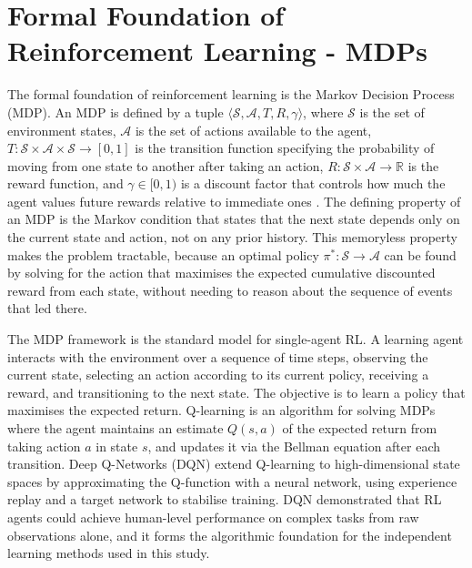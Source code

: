 \documentclass[a4paper,twoside,12pt]{report}
\begin{document}
    \section*{Formal Foundation of Reinforcement Learning - MDPs}
    \label{sec:mdps}
    The formal foundation of reinforcement learning is the Markov Decision Process (MDP). An MDP is defined by a tuple $\langle \mathcal{S}, \mathcal{A}, T, R,
    \gamma \rangle$, where $\mathcal{S}$ is the set of environment states,
    $\mathcal{A}$ is the set of actions available to the agent, $T : \mathcal{S} \times \mathcal{A} \times \mathcal{S} \to [0,1]$ is the transition function specifying the probability of moving from one state to another after taking an action, $R : \mathcal{S} \times \mathcal{A} \to \mathbb{R}$ is the reward function, and $\gamma \in [0,1)$ is a discount factor that controls how much the agent values future rewards relative to immediate ones \citep{sutton2018}.
    The defining property of an MDP is the Markov condition that states that the next state depends only on the current state and action, not on any prior history. This memoryless property makes the problem tractable, because an optimal policy $\pi^* : \mathcal{S} \to \mathcal{A}$ can be found by solving for the action
    that maximises the expected cumulative discounted reward from each state,
    without needing to reason about the sequence of events that led there.
     
    The MDP framework is the standard model for single-agent RL. A learning agent interacts with the environment over a sequence of time steps, observing the current state, selecting an action according to its current policy, receiving a reward, and transitioning to the next state. The objective is to learn a policy that maximises the expected return.
    Q-learning \citep{watkins1992} is an algorithm for solving MDPs where the
    agent maintains an estimate $Q(s,a)$ of the expected return from taking action $a$ in state $s$, and updates it via the Bellman equation after each
    transition. Deep Q-Networks (DQN) \citep{mnih2015} extend Q-learning to
    high-dimensional state spaces by approximating the Q-function with a neural
    network, using experience replay and a target network to stabilise training.
    DQN demonstrated that RL agents could achieve human-level performance on
    complex tasks from raw observations alone, and it forms the algorithmic
    foundation for the independent learning methods used in this study.
    \newline
    
\end{document}
